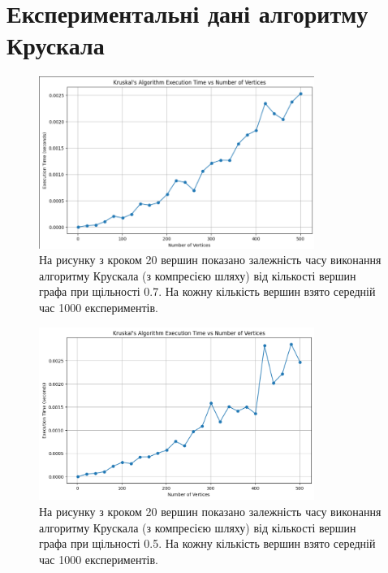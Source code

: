 \documentclass{article}
\begin{document}
\section{Експериментальні дані алгоритму Крускала}
\begin{figure}[h!]
    \centering
    \includegraphics[width=0.8\textwidth]{img/image07.png}
    \caption{На рисунку з кроком 20 вершин показано залежність часу виконання алгоритму Крускала (з компресією шляху) 
    від кількості вершин графа при щільності 0.7. На кожну кількість вершин взято середній час 1000 експериментів.}
\end{figure}
\newpage
\begin{figure}[h!]
    \centering
    \includegraphics[width=0.8\textwidth]{img/image05.png}
    \caption{На рисунку з кроком 20 вершин показано залежність часу виконання алгоритму Крускала (з компресією шляху) 
    від кількості вершин графа при щільності 0.5. На кожну кількість вершин взято середній час 1000 експериментів.}
\end{figure}
\end{document}
